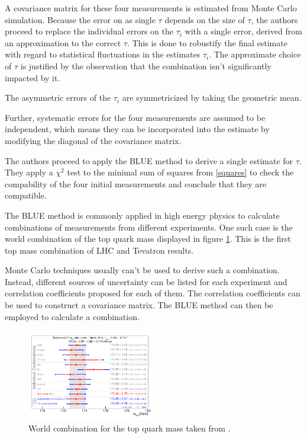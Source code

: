 A covariance matrix for these four measurements is estimated from Monte Carlo simulation.
Because the error on as single $τ$ depends on the size of $τ$, the authors proceed to replace the individual errors on the $τ_i$ with a single error, derived from an approximation to the correct $τ$.
This is done to robustify the final estimate with regard to statistical fluctuations in the estimates $τ_i$.
The approximate choice of $τ$ is justified by the observation that the combination isn't significantly impacted by it.

The asymmetric errors of the $τ_i$ are symmetricized by taking the geometric mean.

Further, systematic errors for the four measurements are assumed to be independent, which means they can be incorporated into the estimate by modifying the diagonal of the covariance matrix.

The authors proceed to apply the BLUE method to derive a single estimate for $τ$.
They apply a $χ^2$ test to the minimal sum of squares from \eqref{squares} to check the compability of the four initial measurements and conclude that they are compatible.

The BLUE method is commonly applied in high energy physics to calculate combinations of measurements from different experiments.
One such case is the world combination of the top quark mass displayed in figure \ref{world}.
This is the first top mass combination of LHC and Tevatron results.

Monte Carlo techniques usually can't be used to derive such a combination.
Instead, different sources of uncertainty can be listed for each experiment and correlation coefficients proposed for each of them.
The correlation coefficients can be used to construct a covariance matrix.
The BLUE method can then be employed to calculate a combination.

\begin{figure}
  \includegraphics[width=0.5\textwidth]{./figures/world.pdf}
  \caption{World combination for the top quark mass taken from \cite{atlas}.}
  \label{world}
\end{figure}
